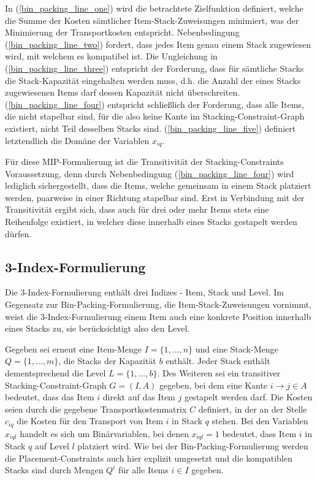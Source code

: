 In (\ref{bin_packing_line_one}) wird die betrachtete Zielfunktion definiert, welche die Summe der Kosten sämtlicher
Item-Stack-Zuweisungen minimiert, was der Minimierung der Transportkosten entspricht.
Nebenbedingung (\ref{bin_packing_line_two}) fordert, dass jedes Item genau einem Stack zugewiesen wird, mit welchem es kompatibel ist.
Die Ungleichung in (\ref{bin_packing_line_three}) entspricht der Forderung, dass für sämtliche Stacks die Stack-Kapazität eingehalten werden muss, d.h.
die Anzahl der eines Stacks zugewiesenen Items darf dessen Kapazität nicht überschreiten. (\ref{bin_packing_line_four}) entspricht schließlich der Forderung, dass alle Items, die nicht stapelbar sind, für die also keine Kante im Stacking-Constraint-Graph existiert, nicht Teil desselben Stacks sind. (\ref{bin_packing_line_five}) definiert letztendlich die Domäne der Variablen $x_{iq}$.

Für diese MIP-Formulierung ist die Transitivität der Stacking-Constraints Voraussetzung, denn durch Nebenbedingung (\ref{bin_packing_line_four}) wird lediglich sichergestellt, dass die Items, welche gemeinsam in einem Stack platziert werden,
paarweise in einer Richtung stapelbar sind. Erst in Verbindung mit der Transitivität ergibt sich, dass auch für drei oder
mehr Items stets eine Reihenfolge existiert, in welcher diese innerhalb eines Stacks gestapelt werden dürfen.

\subsection{3-Index-Formulierung}
\label{sec:three_idx_formulation}

Die 3-Index-Formulierung enthält drei Indizes - Item, Stack und Level.
Im Gegensatz zur Bin-Packing-Formulierung, die Item-Stack-Zuweisungen vornimmt, weist die 3-Index-Formulierung einem
Item auch eine konkrete Position innerhalb eines Stacks zu, sie berücksichtigt also den Level.

Gegeben sei erneut eine Item-Menge $I = \{1, ..., n\}$ und eine Stack-Menge $Q = \{1, ..., m\}$, die Stacks der Kapazität $b$ enthält.
Jeder Stack enthält dementsprechend die Level $L = \{1, ..., b\}$. Des Weiteren sei ein transitiver Stacking-Constraint-Graph
$G = (I, A)$ gegeben, bei dem eine Kante $i \rightarrow j \in A$ bedeutet, dass das Item $i$ direkt auf das Item $j$ gestapelt werden darf.
Die Kosten seien durch die gegebene Transportkostenmatrix $C$ definiert, in der an der Stelle $c_{iq}$ die Kosten für den
Transport von Item $i$ in Stack $q$ stehen. Bei den Variablen $x_{iql}$ handelt es sich um Binärvariablen,
bei denen $x_{iql} = 1$ bedeutet, dass Item $i$ in Stack $q$ auf Level $l$ platziert wird. Wie bei der Bin-Packing-Formulierung
werden die Placement-Constraints auch hier explizit umgesetzt und die kompatiblen Stacks sind durch Mengen $Q^i$ für
alle Items $i \in I$ gegeben.

